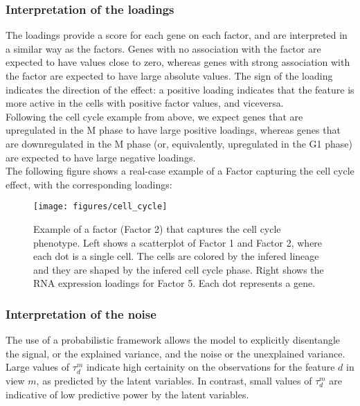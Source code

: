 \subsubsection{Interpretation of the loadings}
The loadings provide a score for each gene on each factor, and are interpreted in a similar way as the factors. Genes with no association with the factor are expected to have values close to zero, whereas genes with strong association with the factor are expected to have large absolute values. The sign of the loading indicates the direction of the effect: a positive loading indicates that the feature is more active in the cells with positive factor values, and viceversa. \\
Following the cell cycle example from above, we expect genes that are upregulated in the M phase to have large positive loadings, whereas genes that are downregulated in the M phase (or, equivalently, upregulated in the G1 phase) are expected to have large negative loadings.\\

The following figure shows a real-case example of a Factor capturing the cell cycle effect, with the corresponding loadings:

\begin{figure}[H]
	\begin{center}
		\texttt{[image: figures/cell\_cycle]}
		\caption{Example of a factor (Factor 2) that captures the cell cycle phenotype. Left shows a scatterplot of Factor 1 and Factor 2, where each dot is a single cell. The cells are colored by the infered lineage and they are shaped by the infered cell cycle phase. Right shows the RNA expression loadings for Factor 5. Each dot represents a gene.  }
		\label{fig:cell_cycle}
	\end{center}
\end{figure}


\subsubsection{Interpretation of the noise}
The use of a probabilistic framework allows the model to explicitly disentangle the signal, or the explained variance, and the noise or the unexplained variance.
Large values of $\tau_d^m$ indicate high certainity on the observations for the feature $d$ in view $m$, as predicted by the latent variables. In contrast, small values of $\tau_d^m$ are indicative of low predictive power by the latent variables.


